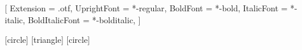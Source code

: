 
\usepackage{fontspec}
\setsansfont{texgyreheros}[
  Extension      = .otf,
  UprightFont    = *-regular,
  BoldFont       = *-bold,
  ItalicFont     = *-italic,
  BoldItalicFont = *-bolditalic,
]

[circle]
[triangle]
[circle]
